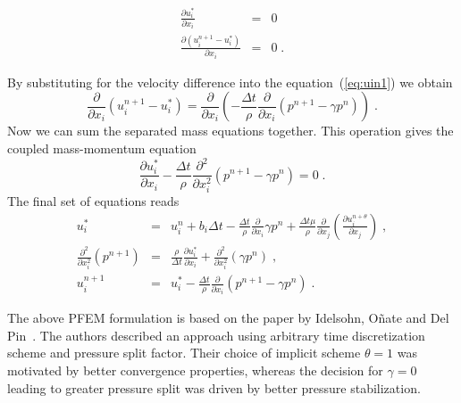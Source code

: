 \documentclass[a4paper]{report}
\newcommand{\pard}[2]{\frac{\partial{#1}}{\partial{#2}}}
\begin{document}
\begin{eqnarray}\label{rce:mass}
	\pard{u^*_i}{x_i} &=& 0 \\
      \pard{(u^{n+1}_i-u^*_i)}{x_i} &=& 0\;.
\end{eqnarray}

By substituting for the velocity difference into the equation~(\ref{eq:uin1}) we obtain
\begin{equation}
\pard{}{x_i}(u^{n+1}_i - u^*_i) = \pard{}{x_i}\left(-\frac{\Delta t}{\rho}\pard{}{x_i}(p^{n+1}-\gamma p^n)\right)\;.
\end{equation}
Now we can sum the separated mass equations together. This operation gives the coupled mass-momentum equation
\begin{equation}
  \pard{u^*_i}{x_i} - \frac{\Delta t}{\rho}\frac{\partial^2}{\partial x^2_i}(p^{n+1}-\gamma p^n) = 0\;.
\end{equation}
The final set of equations reads
\begin{eqnarray}
u^*_i  &=& u^n_i+b_i\Delta t - \frac{\Delta t}{\rho}\pard{}{x_i}\gamma p^n+\frac{\Delta t\mu}{\rho}\pard{}{x_j}\left(\pard{u^{n+\theta}_i}{x_j}\right)\;,\\
\frac{\partial^2}{\partial x^2_i}(p^{n+1}) &=& \frac{\rho}{\Delta t}\pard{u^*_i}{x_i}+\frac{\partial^2}{\partial x^2_i}(\gamma p^n)\;, \\
u^{n+1}_i &=& u^*_i- \frac{\Delta t}{\rho}\pard{}{x_i}(p^{n+1}-\gamma p^n)\;.
\end{eqnarray}
\par
The above PFEM formulation is based on the paper by Idelsohn, O\~nate and Del Pin~\cite{Idelsohn04}. The authors described an approach using arbitrary time discretization scheme and pressure split factor. Their choice of implicit scheme $\theta = 1$ was motivated by better convergence properties, whereas the decision for $\gamma = 0$ leading to greater pressure split was driven by better pressure stabilization.
\end{document}
